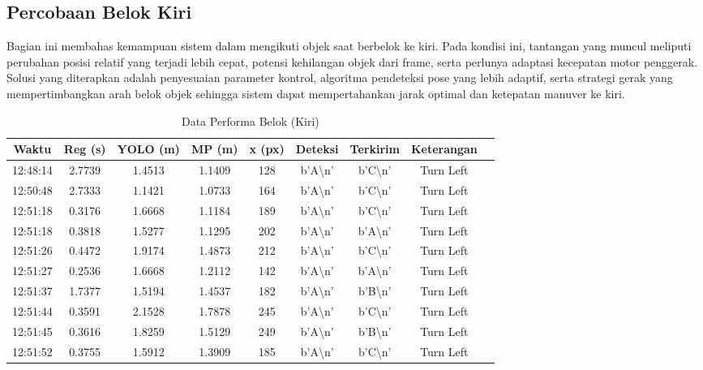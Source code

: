 \newpage
\subsection{Percobaan Belok Kiri}
\label{subsec:percobaanbelokkiri}

Bagian ini membahas kemampuan sistem dalam mengikuti objek saat berbelok ke kiri. Pada kondisi ini, tantangan yang muncul meliputi perubahan posisi relatif yang terjadi lebih cepat, potensi kehilangan objek dari frame, serta perlunya adaptasi kecepatan motor penggerak. Solusi yang diterapkan adalah penyesuaian parameter kontrol, algoritma pendeteksi pose yang lebih adaptif, serta strategi gerak yang mempertimbangkan arah belok objek sehingga sistem dapat mempertahankan jarak optimal dan ketepatan manuver ke kiri.

\begin{table}[H]
    \centering
    \caption{Data Performa Belok (Kiri)}
    \label{tab:performa_belok_kiri}
    \begin{tabular}{|c|c|c|c|c|c|c|c|c|}
    \hline
    Waktu & Reg (s) & YOLO (m) & MP (m) & x (px) & Deteksi & Terkirim & Keterangan \\ \hline
    12:48:14 & 2.7739 & 1.4513 & 1.1409 & 128 & b'A\textbackslash n' & b'C\textbackslash n' & Turn Left \\ \hline
    12:50:48 & 2.7333 & 1.1421 & 1.0733 & 164 & b'A\textbackslash n' & b'C\textbackslash n' & Turn Left \\ \hline
    12:51:18 & 0.3176 & 1.6668 & 1.1184 & 189 & b'A\textbackslash n' & b'C\textbackslash n' & Turn Left \\ \hline
    12:51:18 & 0.3818 & 1.5277 & 1.1295 & 202 & b'A\textbackslash n' & b'A\textbackslash n' & Turn Left \\ \hline
    12:51:26 & 0.4472 & 1.9174 & 1.4873 & 212 & b'A\textbackslash n' & b'C\textbackslash n' & Turn Left \\ \hline
    12:51:27 & 0.2536 & 1.6668 & 1.2112 & 142 & b'A\textbackslash n' & b'A\textbackslash n' & Turn Left \\ \hline
    12:51:37 & 1.7377 & 1.5194 & 1.4537 & 182 & b'A\textbackslash n' & b'B\textbackslash n' & Turn Left \\ \hline
    12:51:44 & 0.3591 & 2.1528 & 1.7878 & 245 & b'A\textbackslash n' & b'C\textbackslash n' & Turn Left \\ \hline
    12:51:45 & 0.3616 & 1.8259 & 1.5129 & 249 & b'A\textbackslash n' & b'B\textbackslash n' & Turn Left \\ \hline
    12:51:52 & 0.3755 & 1.5912 & 1.3909 & 185 & b'A\textbackslash n' & b'C\textbackslash n' & Turn Left \\ \hline

\end{tabular}
\end{table}
